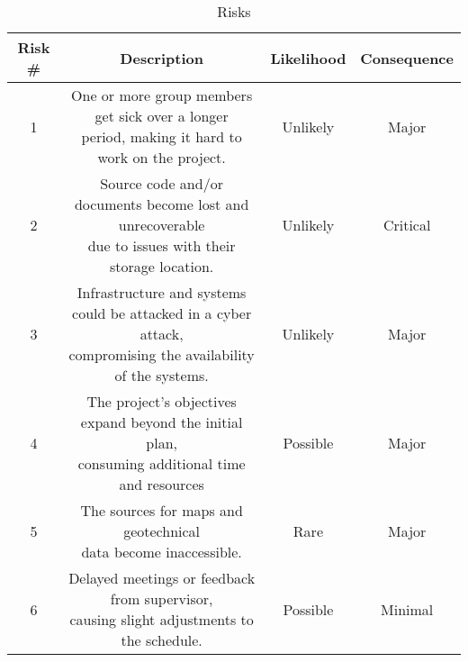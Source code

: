 \begin{table}[H]
    \centering
    \begin{tabular}{|c|c|c|c|}
    \hline
    Risk \# & Description & Likelihood & Consequence \\
    \hline
    1 & \makecell{One or more group members get sick over a longer \\period, making it hard to work on the project.} & Unlikely \cellcolor[HTML]{ffC300} & Major \cellcolor[HTML]{ffC300} \\
    \hline
    2 & \makecell{Source code and/or documents become lost and unrecoverable \\due to  issues with their storage location.} & Unlikely \cellcolor[HTML]{ffC300} & Critical \cellcolor[HTML]{ffC300} \\
    \hline
    3 & \makecell{Infrastructure and systems could be attacked in a cyber attack, \\compromising the availability of the systems. } & Unlikely \cellcolor[HTML]{ffC300} & Major\cellcolor[HTML]{ffC300} \\
    \hline
    4 & \makecell{The project's objectives expand beyond the initial plan, \\ consuming additional time and resources} & Possible \cellcolor[HTML]{ffC300} & Major \cellcolor[HTML]{ffC300} \\
    \hline
    5 & \makecell{The sources for maps and geotechnical \\ data become inaccessible.} & Rare \cellcolor[HTML]{fff000} & Major \cellcolor[HTML]{fff000} \\
    \hline
    6 & \makecell{Delayed meetings or feedback from supervisor, \\ causing slight adjustments to the schedule.} & Possible \cellcolor[HTML]{74ff00} & Minimal \cellcolor[HTML]{74ff00} \\
    \hline
    \end{tabular}
    \caption{Risks}
    \label{tab:risks}
\end{table}

